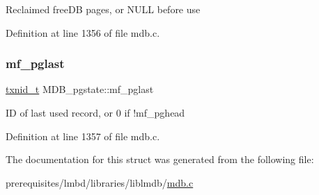 Reclaimed free\+DB pages, or N\+U\+LL before use 

Definition at line 1356 of file mdb.\+c.

\mbox{\label{struct_m_d_b__pgstate_a4a9a958ac39b45693ca27140bd4f63de}} 
\subsubsection{\texorpdfstring{mf\+\_\+pglast}{mf\_pglast}}
{\footnotesize\ttfamily \mbox{\hyperlink{group__internal_gabbaef7c9c710f8652a62c32d748c040e}{txnid\+\_\+t}} M\+D\+B\+\_\+pgstate\+::mf\+\_\+pglast}

ID of last used record, or 0 if !mf\+\_\+pghead 

Definition at line 1357 of file mdb.\+c.



The documentation for this struct was generated from the following file\+:\begin{DoxyCompactItemize}
\item 
prerequisites/lmbd/libraries/liblmdb/\mbox{\hyperlink{mdb_8c}{mdb.\+c}}\end{DoxyCompactItemize}
